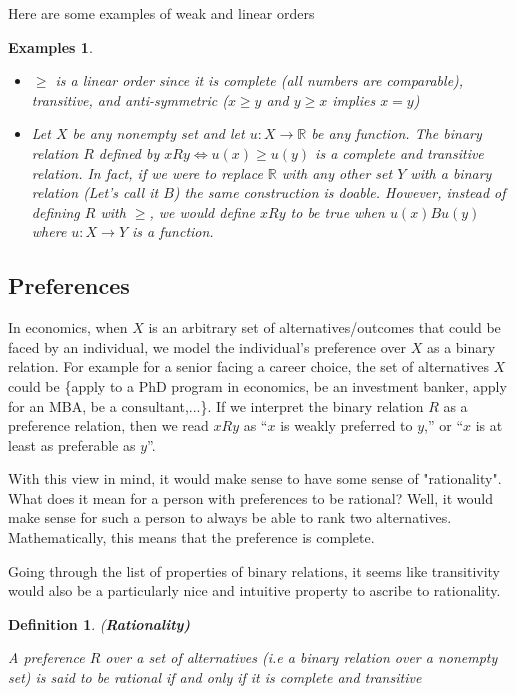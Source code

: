 \documentclass[12pt]{article}
\newtheorem{defin}{Definition}
\newtheorem{unex}[ex]{Examples}
\newcommand{\tn}[1]{\textnormal{#1}}
\newcommand{\name}[1]{\tn{(\textbf{#1)}}}
\newcommand{\RR}{\mathbb{R}}
\newcommand{\IFF}{\Longleftrightarrow}
\newcommand{\3}{\vspace*{3mm}}
\begin{document}
Here are some examples of weak and linear orders 

\begin{unex}
\
\begin{itemize}
\item \tn{$\geq$ is a linear order since it is complete (all numbers are comparable), transitive, and anti-symmetric ($x \geq y $ and $y \geq x$ implies $x = y$)}
\item \tn{Let $X$ be any nonempty set and let $u:X \to \RR$ be \emph{any} function. The binary relation $R$ defined by $x R y \IFF u(x) \geq u(y)$ is a complete and transitive relation. In fact, if we were to replace $\RR$ with any other set $Y$ with a binary relation (Let's call it $B$) the same construction is doable. However, instead of defining $R$ with $\geq$, we would define $x R y$ to be true when $u(x) B u(y)$ where $u: X \to Y$ is a function. }
\end{itemize}
\end{unex}

\subsection{Preferences}

In economics, when $X$ is an arbitrary set of alternatives/outcomes that could be faced by an individual, we model the individual’s preference over $X$ as a binary relation. For example for a senior facing a career choice, the set of alternatives $X$ could be \{apply to a PhD program in economics, be an investment banker, apply for an MBA, be a consultant,...\}. If we interpret the binary relation $R$ as a preference relation, then we read $xRy$ as “$x$ is weakly preferred to $y$,” or “$x$ is at least as preferable as $y$”. 

With this view in mind, it would make sense to have some sense of "rationality". What does it mean for a person with preferences to be rational? Well, it would make sense for such a person to always be able to rank two alternatives. Mathematically, this means that the preference is complete. 

Going through the list of properties of binary relations, it seems like transitivity would also be a particularly nice and intuitive property to ascribe to rationality. 

\begin{defin} \name{Rationality}

\tn{A preference $R$ over a set of alternatives (i.e a binary relation over a nonempty set) is said to be rational if and only if it is complete and transitive }

\end{defin}
\end{document}
